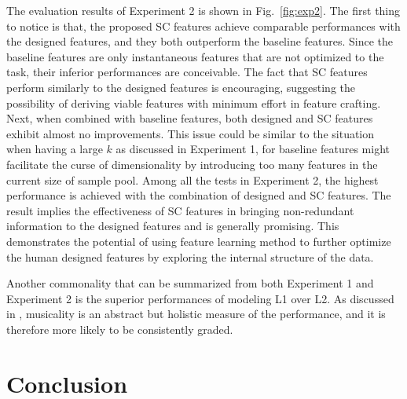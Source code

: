 \documentclass{article}
\begin{document}
The evaluation results of Experiment 2 is shown in Fig.~\ref{fig:exp2}. The first thing to notice is that, the proposed SC features achieve comparable performances with the designed features, and they both outperform the baseline features. Since the baseline features are only instantaneous features that are not optimized to the task, their inferior performances are conceivable. The fact that SC features perform similarly to the designed features is encouraging, suggesting the possibility of deriving viable features with minimum effort in feature crafting. Next, when combined with baseline features, both designed and SC features exhibit almost no improvements. This issue could be similar to the situation when having a large $k$ as discussed in Experiment 1, for baseline features might facilitate the curse of dimensionality by introducing too many features in the current size of sample pool. Among all the tests in Experiment 2, the highest performance is achieved with the combination of designed and SC features. The result implies the effectiveness of SC features in bringing non-redundant information to the designed features and is generally promising. This demonstrates the potential of using feature learning method to further optimize the human designed features by exploring the internal structure of the data.   

Another commonality that can be summarized from both Experiment 1 and Experiment 2 is the superior performances of modeling L1 over L2. As discussed in \cite{Wu2016}, musicality is an abstract but holistic measure of the performance, and it is therefore more likely to be consistently graded. 

\section{Conclusion}\label{sec:conclusion}









\end{document}
